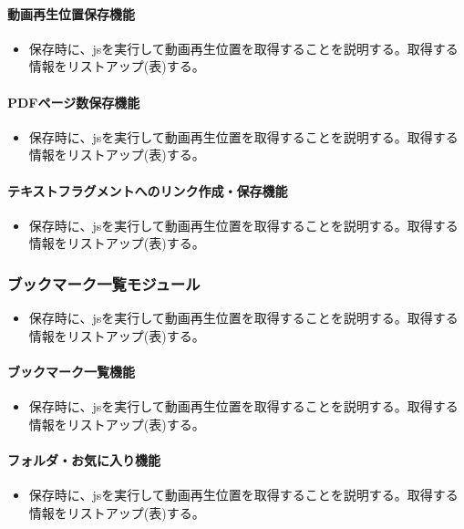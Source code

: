 \paragraph{動画再生位置保存機能}
\begin{itemize}
  \item 保存時に、jsを実行して動画再生位置を取得することを説明する。取得する情報をリストアップ(表)する。
\end{itemize}

\paragraph{PDFページ数保存機能}
\begin{itemize}
  \item 保存時に、jsを実行して動画再生位置を取得することを説明する。取得する情報をリストアップ(表)する。
\end{itemize}

\paragraph{テキストフラグメントへのリンク作成・保存機能}
\begin{itemize}
  \item 保存時に、jsを実行して動画再生位置を取得することを説明する。取得する情報をリストアップ(表)する。
\end{itemize}

\subsubsection{ブックマーク一覧モジュール}
\begin{itemize}
  \item 保存時に、jsを実行して動画再生位置を取得することを説明する。取得する情報をリストアップ(表)する。
\end{itemize}

\paragraph{ブックマーク一覧機能}
\begin{itemize}
  \item 保存時に、jsを実行して動画再生位置を取得することを説明する。取得する情報をリストアップ(表)する。
\end{itemize}

\paragraph{フォルダ・お気に入り機能}
\begin{itemize}
  \item 保存時に、jsを実行して動画再生位置を取得することを説明する。取得する情報をリストアップ(表)する。
\end{itemize}

